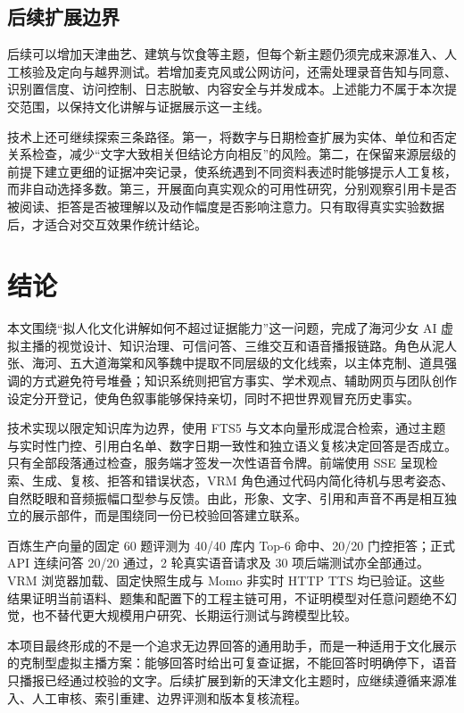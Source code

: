 \documentclass[UTF8,zihao=-4,fontset=none,twoside]{ctexart}
\begin{document}
\subsection{后续扩展边界}

后续可以增加天津曲艺、建筑与饮食等主题，但每个新主题仍须完成来源准入、人工核验及定向与越界测试。若增加麦克风或公网访问，还需处理录音告知与同意、识别置信度、访问控制、日志脱敏、内容安全与并发成本。上述能力不属于本次提交范围，以保持文化讲解与证据展示这一主线。

技术上还可继续探索三条路径。第一，将数字与日期检查扩展为实体、单位和否定关系检查，减少“文字大致相关但结论方向相反”的风险。第二，在保留来源层级的前提下建立更细的证据冲突记录，使系统遇到不同资料表述时能够提示人工复核，而非自动选择多数。第三，开展面向真实观众的可用性研究，分别观察引用卡是否被阅读、拒答是否被理解以及动作幅度是否影响注意力。只有取得真实实验数据后，才适合对交互效果作统计结论。

\FloatBarrier

\section{结论}

本文围绕“拟人化文化讲解如何不超过证据能力”这一问题，完成了海河少女 AI 虚拟主播的视觉设计、知识治理、可信问答、三维交互和语音播报链路。角色从泥人张、海河、五大道海棠和风筝魏中提取不同层级的文化线索，以主体克制、道具强调的方式避免符号堆叠；知识系统则把官方事实、学术观点、辅助网页与团队创作设定分开登记，使角色叙事能够保持亲切，同时不把世界观冒充历史事实。

技术实现以限定知识库为边界，使用 FTS5 与文本向量形成混合检索，通过主题与实时性门控、引用白名单、数字日期一致性和独立语义复核决定回答是否成立。只有全部段落通过检查，服务端才签发一次性语音令牌。前端使用 SSE 呈现检索、生成、复核、拒答和错误状态，VRM 角色通过代码内简化待机与思考姿态、自然眨眼和音频振幅口型参与反馈。由此，形象、文字、引用和声音不再是相互独立的展示部件，而是围绕同一份已校验回答建立联系。

百炼生产向量的固定 60 题评测为 40/40 库内 Top-6 命中、20/20 门控拒答；正式 API 连续问答 20/20 通过，2 轮真实语音请求及 30 项后端测试亦全部通过。VRM 浏览器加载、固定快照生成与 Momo 非实时 HTTP TTS 均已验证。这些结果证明当前语料、题集和配置下的工程主链可用，不证明模型对任意问题绝不幻觉，也不替代更大规模用户研究、长期运行测试与跨模型比较。

本项目最终形成的不是一个追求无边界回答的通用助手，而是一种适用于文化展示的克制型虚拟主播方案：能够回答时给出可复查证据，不能回答时明确停下，语音只播报已经通过校验的文字。后续扩展到新的天津文化主题时，应继续遵循来源准入、人工审核、索引重建、边界评测和版本复核流程。

\clearpage
\printbibliography[heading=bibintoc,title={参考文献}]
\end{document}
